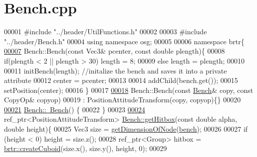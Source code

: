 \hypertarget{_bench_8cpp_source}{\section{Bench.\+cpp}
\label{_bench_8cpp_source}
}

\begin{DoxyCode}
00001 \textcolor{preprocessor}{#include "../header/UtilFunctions.h"}
00002 
00003 \textcolor{preprocessor}{#include "../header/Bench.h"}
00004 \textcolor{keyword}{using namespace }osg;
00005 
00006 \textcolor{keyword}{namespace }brtr\{
\hypertarget{_bench_8cpp_source_l00007}{}\hyperlink{classbrtr_1_1_bench_a66ae6f45365c36daeabeed1a4b778d83}{00007}     Bench::Bench(\textcolor{keyword}{const} Vec3& pcenter, \textcolor{keyword}{const} \textcolor{keywordtype}{double} plength)\{
00008       \textcolor{keywordflow}{if}(plength < 2 || plength > 30) length = 8;
00009             \textcolor{keywordflow}{else} length = plength;
00010         
00011         initBench(length); \textcolor{comment}{//initalize the bench and saves it into a private attribute}
00012         center = pcenter;
00013 
00014         addChild(bench.get()); 
00015         setPosition(center);
00016     \}
00017 
\hypertarget{_bench_8cpp_source_l00018}{}\hyperlink{classbrtr_1_1_bench_a9bd8ae1e6e48eb278206eff7102cac23}{00018}     Bench::Bench(\textcolor{keyword}{const} \hyperlink{classbrtr_1_1_bench}{Bench}& copy, \textcolor{keyword}{const} CopyOp& copyop)
00019         : PositionAttitudeTransform(copy, copyop)\{\}
00020 
\hypertarget{_bench_8cpp_source_l00021}{}\hyperlink{classbrtr_1_1_bench_a22ffdb328f6dac6737108d0f7aa34f67}{00021}     \hyperlink{classbrtr_1_1_bench_a22ffdb328f6dac6737108d0f7aa34f67}{Bench::~Bench}() \{
00022     \}   
00023 
\hypertarget{_bench_8cpp_source_l00024}{}\hyperlink{classbrtr_1_1_bench_ad59e81ffbe90a7297bd5f256a54a234e}{00024}     ref\_ptr<PositionAttitudeTransform> \hyperlink{classbrtr_1_1_bench_ad59e81ffbe90a7297bd5f256a54a234e}{Bench::getHitbox}(\textcolor{keyword}{const} \textcolor{keywordtype}{double} alpha, \textcolor{keywordtype}{double} height)\{     
00025         Vec3 size = \hyperlink{namespacebrtr_a24ba7c5d07ad50afb09990116dd3556d}{getDimensionOfNode}(\hyperlink{classbrtr_1_1_bench_aa3da8798872d1c2d595c24a48a5cb427}{bench});
00026         
00027         \textcolor{keywordflow}{if} (height < 0) height = size.z();
00028         ref\_ptr<Group> hitbox = \hyperlink{namespacebrtr_ae7f155c263aec9663a02763ed0bb882b}{brtr::createCuboid}(size.x(), size.y(), height, 0);
00029         

\end{DoxyCode}
